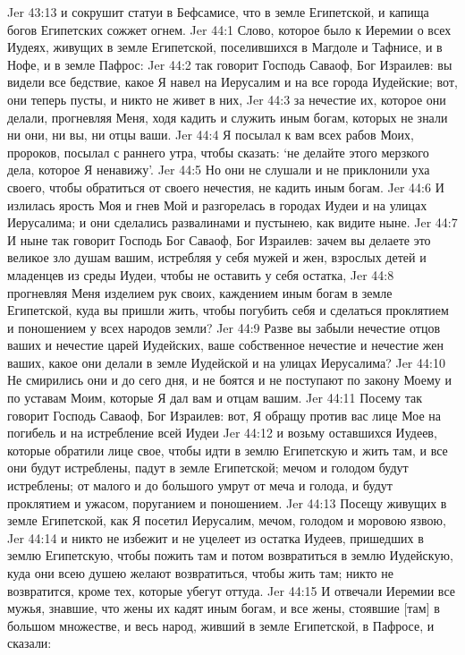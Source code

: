 Jer 43:13  и сокрушит статуи в Бефсамисе, что в земле Египетской, и капища богов Египетских сожжет огнем.
Jer 44:1  Слово, которое было к Иеремии о всех Иудеях, живущих в земле Египетской, поселившихся в Магдоле и Тафнисе, и в Нофе, и в земле Пафрос:
Jer 44:2  так говорит Господь Саваоф, Бог Израилев: вы видели все бедствие, какое Я навел на Иерусалим и на все города Иудейские; вот, они теперь пусты, и никто не живет в них,
Jer 44:3  за нечестие их, которое они делали, прогневляя Меня, ходя кадить и служить иным богам, которых не знали ни они, ни вы, ни отцы ваши.
Jer 44:4  Я посылал к вам всех рабов Моих, пророков, посылал с раннего утра, чтобы сказать: `не делайте этого мерзкого дела, которое Я ненавижу'.
Jer 44:5  Но они не слушали и не приклонили уха своего, чтобы обратиться от своего нечестия, не кадить иным богам.
Jer 44:6  И излилась ярость Моя и гнев Мой и разгорелась в городах Иудеи и на улицах Иерусалима; и они сделались развалинами и пустынею, как видите ныне.
Jer 44:7  И ныне так говорит Господь Бог Саваоф, Бог Израилев: зачем вы делаете это великое зло душам вашим, истребляя у себя мужей и жен, взрослых детей и младенцев из среды Иудеи, чтобы не оставить у себя остатка,
Jer 44:8  прогневляя Меня изделием рук своих, каждением иным богам в земле Египетской, куда вы пришли жить, чтобы погубить себя и сделаться проклятием и поношением у всех народов земли?
Jer 44:9  Разве вы забыли нечестие отцов ваших и нечестие царей Иудейских, ваше собственное нечестие и нечестие жен ваших, какое они делали в земле Иудейской и на улицах Иерусалима?
Jer 44:10  Не смирились они и до сего дня, и не боятся и не поступают по закону Моему и по уставам Моим, которые Я дал вам и отцам вашим.
Jer 44:11  Посему так говорит Господь Саваоф, Бог Израилев: вот, Я обращу против вас лице Мое на погибель и на истребление всей Иудеи
Jer 44:12  и возьму оставшихся Иудеев, которые обратили лице свое, чтобы идти в землю Египетскую и жить там, и все они будут истреблены, падут в земле Египетской; мечом и голодом будут истреблены; от малого и до большого умрут от меча и голода, и будут проклятием и ужасом, поруганием и поношением.
Jer 44:13  Посещу живущих в земле Египетской, как Я посетил Иерусалим, мечом, голодом и моровою язвою,
Jer 44:14  и никто не избежит и не уцелеет из остатка Иудеев, пришедших в землю Египетскую, чтобы пожить там и потом возвратиться в землю Иудейскую, куда они всею душею желают возвратиться, чтобы жить там; никто не возвратится, кроме тех, которые убегут оттуда.
Jer 44:15  И отвечали Иеремии все мужья, знавшие, что жены их кадят иным богам, и все жены, стоявшие [там] в большом множестве, и весь народ, живший в земле Египетской, в Пафросе, и сказали:
